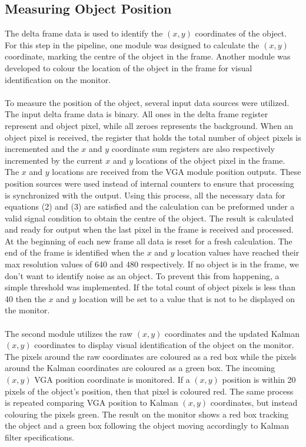 \documentclass[11pt]{article} %
\begin{document}
\subsection{Measuring Object Position}
The delta frame data is used to identify the $(x,y)$ coordinates of the object. For this step in the pipeline, one module was designed to calculate the $(x,y)$ coordinate, marking the centre of the object in the frame. Another module was developed to colour the location of the object in the frame for visual identification on the monitor. \\\\
To measure the position of the object, several input data sources were utilized. The input delta frame data is binary. All ones in the delta frame register represent and object pixel, while all zeroes represents the background. When an object pixel is received, the register that holds the total number of object pixels is incremented and the $x$ and $y$ coordinate sum registers are also respectively incremented by the current $x$ and $y$ locations of the object pixel in the frame. The $x$ and $y$ locations are received from the VGA module position outputs. These position sources were used instead of internal counters to ensure that processing is synchronized with the output. Using this process, all the necessary data for equations (2) and (3) are satisfied and the calculation can be preformed under a valid signal condition to obtain the centre of the object. The result is calculated and ready for output when the last pixel in the frame is received and processed. At the beginning of each new frame all data is reset for a fresh calculation. The end of the frame is identified when the $x$ and $y$ location values have reached their max resolution values of 640 and 480 respectively. If no object is in the frame, we don't want to identify noise as an object. To prevent this from happening, a simple threshold was implemented. If the total count of object pixels is less than 40 then the $x$ and $y$ location will be set to a value that is not to be displayed on the monitor. \\\\
The second module utilizes the raw $(x,y)$ coordinates and the updated Kalman $(x,y)$ coordinates to display visual identification of the object on the monitor. The pixels around the raw coordinates are coloured as a red box while the pixels around the Kalman coordinates are coloured as a green box. The incoming $(x,y)$ VGA position coordinate is monitored. If a $(x,y)$ position is within 20 pixels of the object's position, then that pixel is coloured red. The same process is repeated comparing VGA position to Kalman $(x,y)$ coordinates, but instead colouring the pixels green. The result on the monitor shows a red box tracking the object and a green box following the object moving accordingly to Kalman filter specifications. 
\end{document}
